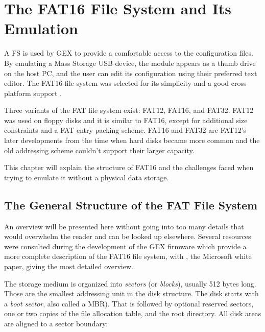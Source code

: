\chapter{The FAT16 File System and Its Emulation} \label{sec:fat16}

A \gls{FS} is used by GEX to provide a comfortable access to the configuration files. By emulating a Mass Storage \gls{USB} device, the module appears as a thumb drive on the host \gls{PC}, and the user can edit its configuration using their preferred text editor. The FAT16 file system was selected for its simplicity and a good cross-platform support \cite{os-support-table}.

Three variants of the \gls{FAT} file system exist: FAT12, FAT16, and FAT32. FAT12 was used on floppy disks and it is similar to FAT16, except for additional size constraints and a \gls{FAT} entry packing scheme. FAT16 and FAT32 are FAT12's later developments from the time when hard disks became more common and the old addressing scheme couldn't support their larger capacity.

This chapter will explain the structure of FAT16 and the challenges faced when trying to emulate it without a physical data storage.

\section{The General Structure of the FAT File System}

An overview will be presented here without going into too many details that would overwhelm the reader and can be looked up elsewhere. Several resources \cite{ms-fat,fat16-brainy,fat16-maverick,fat16-phobos,fat-whitepaper} were consulted during the development of the GEX firmware which provide a more complete description of the FAT16 file system, with \cite{fat-whitepaper}, the Microsoft white paper, giving the most detailed overview.

The storage medium is organized into \textit{sectors} (or \textit{blocks}), usually 512 bytes long. Those are the smallest addressing unit in the disk structure. The disk starts with a \textit{boot sector}, also called a \gls{MBR}). That is followed by optional reserved sectors, one or two copies of the file allocation table, and the root directory. All disk areas are aligned to a sector boundary:

